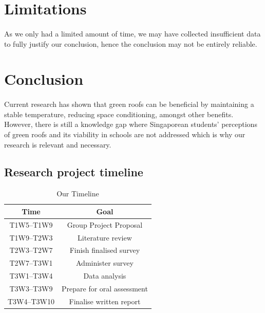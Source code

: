 \documentclass{article}
\begin{document}
\begin{multicols}{2}
  \section{Limitations}
  \paragraph{} As we only had a limited amount of time, we may have collected
  insufficient data to fully justify our conclusion, hence the conclusion may
  not be entirely reliable.
  \section{Conclusion}
  \paragraph{} Current research has shown that green roofs can be
  beneficial by maintaining a stable temperature, reducing space
  conditioning, amongst other benefits. However, there is still
  a knowledge gap where Singaporean students' perceptions of green
  roofs and its viability in schools are not addressed which is why our
  research is relevant and necessary.

\end{multicols}

\newpage

\printbibliography[heading=bibintoc,title={References}]

\newpage

\begin{appendices}
  \section{Research project timeline}
  \begin{table}[h!]
    \begin{center}
      \caption{Our Timeline}
      \label{tab:timeline}
      \begin{tabular}{|c|c|}
        \rowcolor{cyan}
        \textbf{Time} & \textbf{Goal} \\ \hline
        T1W5--T1W9 & Group Project Proposal \\ \hline
        \rowcolor{gray}
        T1W9--T2W3 & Literature review \\ \hline
        T2W3--T2W7 & Finish finalised survey \\ \hline
        \rowcolor{gray}
        T2W7--T3W1 & Administer survey \\ \hline
        T3W1--T3W4 & Data analysis \\ \hline
        \rowcolor{gray}
        T3W3--T3W9 & Prepare for oral assessment \\ \hline
        T3W4--T3W10 & Finalise written report \\ \hline
      \end{tabular}
    \end{center}
  \end{table}
\end{appendices}
\end{document}

